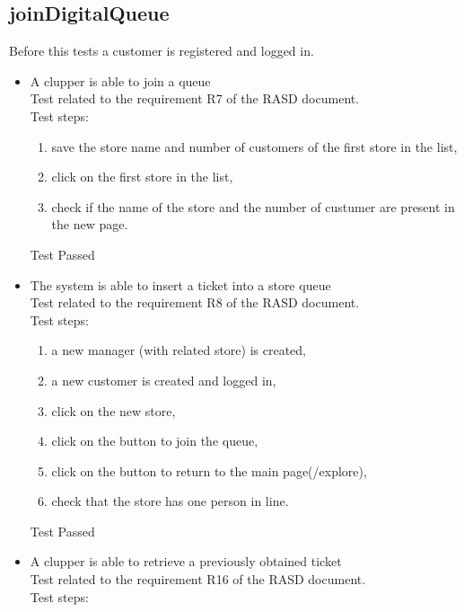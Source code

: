 \subsection{joinDigitalQueue}

Before this tests a customer is registered and logged in.

\begin{itemize}
    \item A clupper is able to join a queue \\
    Test related to the requirement R7 of the RASD document. \\
    Test steps:\\

    \begin{enumerate}
        \item save the store name and number of customers of the first store in the list,
        \item click on the first store in the list,
        \item check if the name of the store and the number of custumer are present in the new page.
    \end{enumerate}
    Test Passed

    \item The system is able to insert a ticket into a store queue \\
    Test related to the requirement R8 of the RASD document. \\
    Test steps: \\
    \begin{enumerate}

        \item a new manager (with related store) is created,

        \item a new customer is created and logged in,

        \item click on the new store,

        \item click on the button to join the queue,

        \item click on the button to return to the main page(/explore),

        \item check that the store has one person in line.
    \end{enumerate}
    Test Passed

    \item A clupper is able to retrieve a previously obtained ticket \\
    Test related to the requirement R16 of the RASD document. \\
    Test steps: \\
    \begin{enumerate}


\end{enumerate}
\end{itemize}
